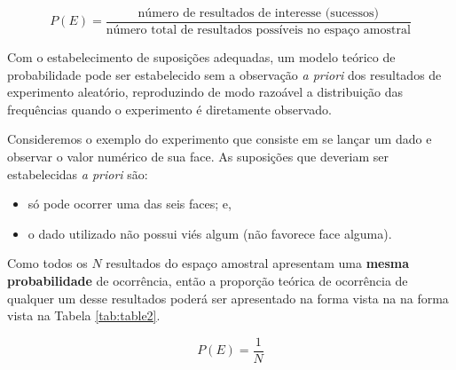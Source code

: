 \documentclass[
]{book}
\providecommand{\tightlist}{%
  \setlength{\itemsep}{0pt}\setlength{\parskip}{0pt}}
\begin{document}
\hfill\break

\[
P(E)= \frac{\text{número de resultados de interesse (sucessos)}}{\text{número total de resultados possíveis no espaço amostral}}
\]

\hfill\break

Com o estabelecimento de suposições adequadas, um modelo teórico de probabilidade pode ser estabelecido sem a observação \emph{a priori} dos resultados de experimento aleatório, reproduzindo de modo razoável a distribuição das frequências quando o experimento é diretamente observado.

\hfill\break

Consideremos o exemplo do experimento que consiste em se lançar um dado e observar o valor numérico de sua face. As suposições que deveriam ser estabelecidas \emph{a priori} são:

\hfill\break

\begin{itemize}
\tightlist
\item
  só pode ocorrer uma das seis faces; e,
\item
  o dado utilizado não possui viés algum (não favorece face alguma).
\end{itemize}

\hfill\break

Como todos os \(N\) resultados do espaço amostral apresentam uma \textbf{mesma probabilidade} de ocorrência, então a proporção teórica de ocorrência de qualquer um desse resultados poderá ser apresentado na forma vista na na forma vista na Tabela \ref{tab:table2}.

\hfill\break

\[
P(E)= \frac{1}{N}
\]

\hfill\break
\end{document}
